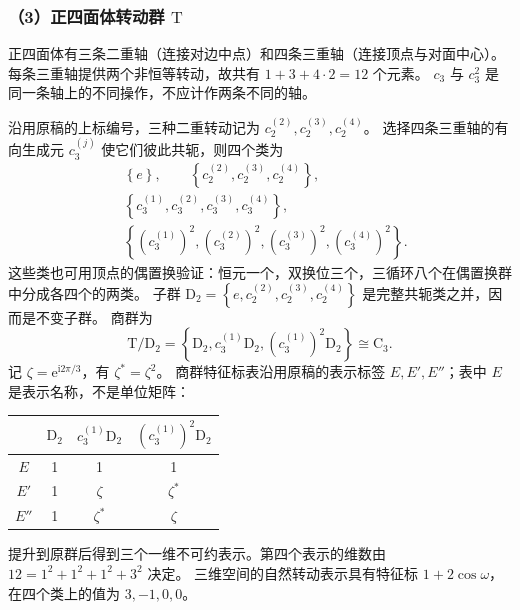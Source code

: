 \subsubsection*{（3）正四面体转动群 $\mathrm{T}$}
正四面体有三条二重轴（连接对边中点）和四条三重轴（连接顶点与对面中心）。
每条三重轴提供两个非恒等转动，故共有 $1+3+4\cdot2=12$ 个元素。
$c_3$ 与 $c_3^2$ 是同一条轴上的不同操作，不应计作两条不同的轴。

沿用原稿的上标编号，三种二重转动记为 $c_2^{\left(2\right)},c_2^{\left(3\right)},c_2^{\left(4\right)}$。
选择四条三重轴的有向生成元 $c_3^{\left(j\right)}$ 使它们彼此共轭，则四个类为
\begin{align}
&\left\{e\right\},\qquad\left\{c_2^{\left(2\right)},c_2^{\left(3\right)},c_2^{\left(4\right)}\right\},\\
&\left\{c_3^{\left(1\right)},c_3^{\left(2\right)},c_3^{\left(3\right)},c_3^{\left(4\right)}\right\},\\
&\left\{\left(c_3^{\left(1\right)}\right)^2,\left(c_3^{\left(2\right)}\right)^2,\left(c_3^{\left(3\right)}\right)^2,\left(c_3^{\left(4\right)}\right)^2\right\}.
\end{align}
这些类也可用顶点的偶置换验证：恒元一个，双换位三个，三循环八个在偶置换群中分成各四个的两类。
子群 $\mathrm{D}_2=\left\{e,c_2^{\left(2\right)},c_2^{\left(3\right)},c_2^{\left(4\right)}\right\}$ 是完整共轭类之并，因而是不变子群。
商群为
\begin{equation}
\mathrm{T}/\mathrm{D}_2=\left\{\mathrm{D}_2,c_3^{\left(1\right)}\mathrm{D}_2,\left(c_3^{\left(1\right)}\right)^2\mathrm{D}_2\right\}
\cong\mathrm{C}_3.
\end{equation}
记 $\zeta=\mathrm{e}^{\mathrm{i}2\pi/3}$，有 $\zeta^*=\zeta^2$。
商群特征标表沿用原稿的表示标签 $E,E',E''$；表中 $E$ 是表示名称，不是单位矩阵：
\begin{center}
\begin{tabular}{c|ccc}
\toprule
 & $\mathrm{D}_2$ & $c_3^{\left(1\right)}\mathrm{D}_2$ & $\left(c_3^{\left(1\right)}\right)^2\mathrm{D}_2$\\\midrule
$E$ & 1 & 1 & 1\\
$E'$ & 1 & $\zeta$ & $\zeta^*$\\
$E''$ & 1 & $\zeta^*$ & $\zeta$\\\bottomrule
\end{tabular}
\end{center}
提升到原群后得到三个一维不可约表示。第四个表示的维数由
$12=1^2+1^2+1^2+3^2$ 决定。
三维空间的自然转动表示具有特征标 $1+2\cos\omega$，在四个类上的值为 $3,-1,0,0$。
